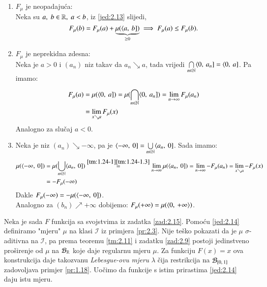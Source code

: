 \begin{rj}[\ref{zad:2.15}]  \label{rj:2.15}
    \quad
    \begin{enumerate}[label=\arabic*.]
        \item $F_{\mu}$ je neopadaju\' ca:\\
        Neka su $a, \; b \in \mathbb{R}, \; a < b$, iz \eqref{jed:2.13} slijedi,
        \begin{equation*}
            F_\mu (b) = F_\mu (a) + \underbrace{\mu (\langle {a}, \: {b}])}_{\geq 0} \implies F_\mu (a) \leq F_\mu (b).
        \end{equation*}
        \item $F_\mu$ je neprekidna zdesna:\\
        Neka je $a > 0$ i $(a_n)$ niz takav da $a_n \searrow a$, tada vrijedi $\bigcap\limits_{n \in \mathbb{N}}^{} \langle {0}, \: {a_n}] = \langle {0}, \: {a}]$.
        Pa imamo:
        \begin{equation*}
            \begin{aligned}
                F_\mu (a) &= \mu(\langle {0}, \: {a}]) = \mu (\bigcap\limits_{n \in \mathbb{N}}^{} \langle {0}, \: {a_n}]) = \lim\limits_{n \to \infty} F_\mu (a_n)\\
                &= \lim_{x \searrow a} F_\mu (x)
            \end{aligned}
        \end{equation*}
        Analogno za slu\v caj $a < 0$.
        \item Neka je niz $(a_n) \searrow -\infty$, pa je $\langle {-\infty}, \: {0}] = \bigcup\limits_{n \in \mathbb{N}}^{} \langle {a_n}, \: {0}]$.
        Sada imamo:
        \begin{equation*}
            \begin{aligned}
                \mu (\langle {-\infty}, \: {0}]) &= \mu (\bigcup\limits_{n \in \mathbb{N}}^{} \langle {a_n}, \: {0}]) \overset{\ref{tm:1.24-1} \ref{tm:1.24-1.3}}{=} \lim\limits_{n \to \infty} \mu({\langle {a_n}, \: {0}]}) = \lim\limits_{n \to \infty} - F_\mu (a_n) = \lim\limits_{x \searrow a} - F_\mu (x)\\
                &= - F_\mu (-\infty)
            \end{aligned}
        \end{equation*}
        Dakle $F_\mu (-\infty) = - \mu (\langle {-\infty}, \: {0}])$.\\
        Analogno za $(b_n) \nearrow +\infty$ dobijemo:
        $F_\mu (+\infty) = \mu (\langle {0}, \: {+\infty} \rangle)$.
    \end{enumerate}
\end{rj}

Neka je sada $F$ funkcija sa svojstvima iz zadatka \ref{zad:2.15}.
Pomo\' cu \eqref{jed:2.14} definiramo "mjeru" $\mu$ na klasi $\mathcal{I}$ iz primjera \eqref{pr:2.3}.
Nije te\v sko pokazati da je $\mu$ $\sigma$-aditivna na $\mathcal{I}$, pa prema teoremu \ref{tm:2.11} i zadatku \ref{zad:2.9} postoji jedinstveno pro\v sirenje od $\mu$ na $\mathcal{B}_{\mathbb{R}}$ koje daje regularnu mjeru $\mu$.
Za funkciju $F(x) = x$ ova konstrukcija daje takozvanu \emph{Lebesgue-ovu mjeru} $\lambda$ \v cija restrikcija na $\mathcal{B}_{[{0}, \:{1}]}$ zadovoljava primjer \ref{pr:1.18}.
Uo\v cimo da funkcije s istim prirastima \eqref{jed:2.14} daju istu mjeru.
